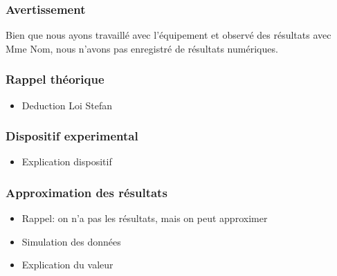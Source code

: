 \documentclass{beamer}
\begin{document}
\begin{frame}
\frametitle{Avertissement}
Bien que nous ayons travaillé avec l'équipement et observé des résultats avec {\color{red} Mme Nom}, nous n'avons pas enregistré de résultats numériques.
\end{frame}





\begin{frame}
\frametitle{Rappel théorique}

\begin{itemize}
	\item{Deduction Loi Stefan}

\end{itemize}

\end{frame}





\begin{frame}
\frametitle{Dispositif experimental}

\begin{itemize}
	\item{Explication dispositif}
	
\end{itemize}	
	
\end{frame}





\begin{frame}
\frametitle{Approximation des résultats}

\begin{itemize}
	\item{Rappel: on n'a pas les résultats, mais on peut approximer}
	\item{Simulation des données}
	\item{Explication du valeur}
	
\end{itemize}
\end{frame}
\end{document}
